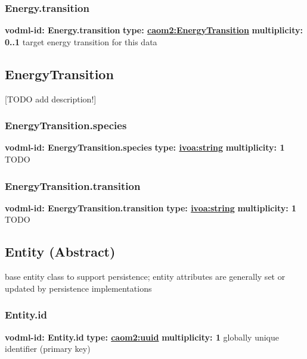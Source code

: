     \subsubsection{Energy.transition}
      \textbf{vodml-id: Energy.transition} \newline
      \textbf{type: \hyperref[sect:EnergyTransition]{caom2:EnergyTransition}} \newline
      \textbf{multiplicity: 0..1} \newline
      target energy transition for this data

  \subsection{EnergyTransition}
  \label{sect:EnergyTransition}
    [TODO add description!]

    \subsubsection{EnergyTransition.species}
      \textbf{vodml-id: EnergyTransition.species} \newline
      \textbf{type: \hyperref[sect:ivoa]{ivoa:string}} \newline
      \textbf{multiplicity: 1} \newline
      TODO

    \subsubsection{EnergyTransition.transition}
      \textbf{vodml-id: EnergyTransition.transition} \newline
      \textbf{type: \hyperref[sect:ivoa]{ivoa:string}} \newline
      \textbf{multiplicity: 1} \newline
      TODO

  \subsection{Entity (Abstract)}
  \label{sect:Entity}
    base entity class to support persistence; entity attributes are generally set or updated by persistence implementations

    \subsubsection{Entity.id}
      \textbf{vodml-id: Entity.id} \newline
      \textbf{type: \hyperref[sect:uuid]{caom2:uuid}} \newline
      \textbf{multiplicity: 1} \newline
      globally unique identifier (primary key)

